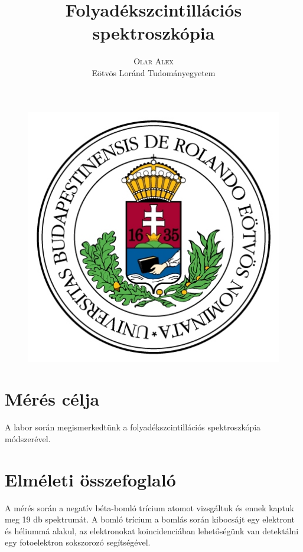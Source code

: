 \documentclass[12pt,a4paper]{article}
\title{\textbf{Folyadékszcintillációs spektroszkópia}}
\author{\Large{\textsc{Olar Alex}} \vspace{10pt}\\
	\textrm{Eötvös Loránd Tudományegyetem}
	}
\date{}
\theoremstyle{plain}
\begin{document}
\addtolength{\voffset}{-1.0cm}
\addtolength{\textheight}{1.0cm}
\begin{titlepage}
	\maketitle

	\vfill

	\begin{figure}[H]
		\centering
		\includegraphics[scale=0.6]{eltecimer.jpg}
	\end{figure}

	\thispagestyle{empty}
\end{titlepage}

\section{Mérés célja}
\hspace*{10pt} A labor során megismerkedtünk
a folyadékszcintillációs spektroszkópia módszerével.

\section{Elméleti összefoglaló}
\hspace*{10pt} A mérés során a negatív béta-bomló trícium atomot
vizsgáltuk és ennek kaptuk meg 19 db spektrumát. A bomló trícium
a bomlás során kibocsájt egy elektront és héliummá alakul, az
elektronokat koincidenciában lehetőségünk van detektálni egy fotoelektron
sokszorozó segítségével.
\end{document}
